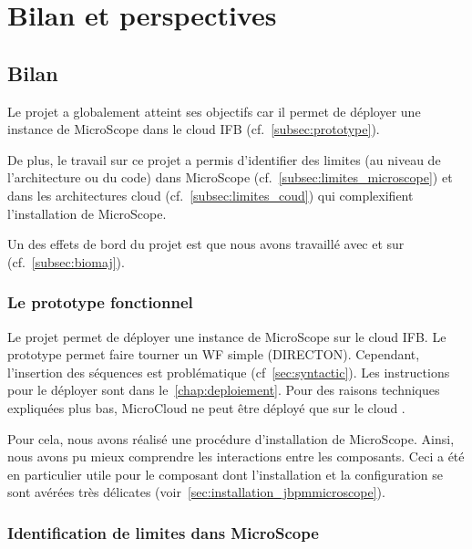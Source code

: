 \chapter{Bilan et perspectives}

\section{Bilan}

Le projet a globalement atteint ses objectifs car il permet de déployer une instance de MicroScope dans le cloud IFB (cf.~\autoref{subsec:prototype}).

De plus, le travail sur ce projet a permis d'identifier des limites (au niveau de l'architecture ou du code) dans MicroScope (cf.~\autoref{subsec:limites_microscope})
et dans les architectures cloud (cf.~\autoref{subsec:limites_coud})
qui complexifient l'installation de MicroScope.

Un des effets de bord du projet est que nous avons travaillé avec et sur  (cf.~\autoref{subsec:biomaj}).

\subsection{Le prototype fonctionnel} \label{subsec:prototype}

Le projet permet de déployer une instance de MicroScope
sur le cloud IFB.
Le prototype permet faire tourner un WF simple (DIRECTON).
Cependant, l'insertion des séquences est problématique (cf~\autoref{sec:syntactic}).
Les instructions pour le déployer sont dans le~\autoref{chap:deploiement}.
Pour des raisons techniques expliquées plus bas,
MicroCloud ne peut être déployé que sur le cloud .

Pour cela, nous avons réalisé une procédure d'installation de MicroScope.
Ainsi, nous avons pu mieux comprendre les interactions entre les composants.
Ceci a été en particulier utile pour le composant  dont l'installation et la configuration
se sont avérées très délicates (voir~\autoref{sec:installation_jbpmmicroscope}).

\subsection{Identification de limites dans MicroScope} \label{subsec:limites_microscope}

